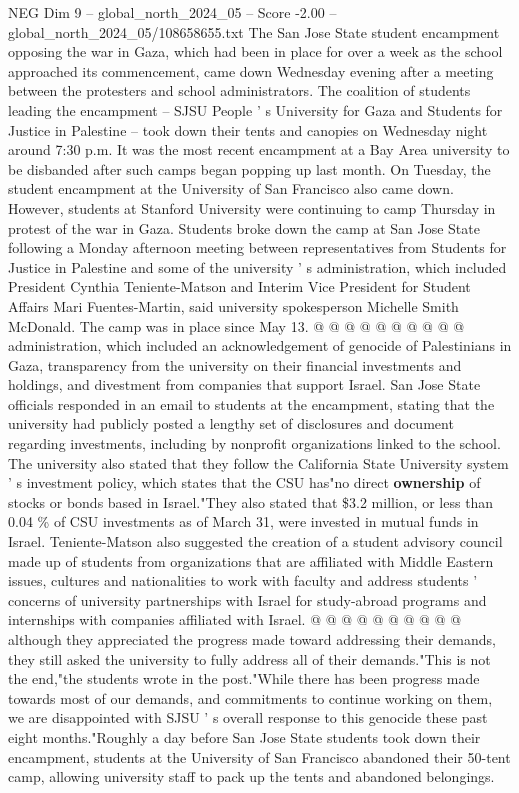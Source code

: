 \begin{textsample}{NEG Dim 9 – global\_north\_2024\_05 – Score -2.00 – global\_north\_2024\_05/108658655.txt}  \label{ex:f9_neg_165}
The San Jose State student encampment opposing the war in Gaza, which had been in place for over a week as the school approached its commencement, came down Wednesday evening after a meeting between the protesters and school administrators.
The coalition of students leading the encampment -- SJSU People ' s University for Gaza and Students for Justice in Palestine -- took down their tents and canopies on Wednesday night around 7:30 p.m.
It was the most recent encampment at a Bay Area university to be disbanded after such camps began popping up last month.
On Tuesday, the student encampment at the University of San Francisco also came down.
However, students at Stanford University were continuing to camp Thursday in protest of the war in Gaza.
Students broke down the camp at San Jose State following a Monday afternoon meeting between representatives from Students for Justice in Palestine and some of the university ' s administration, which included President Cynthia Teniente-Matson and Interim Vice President for Student Affairs Mari Fuentes-Martin, said university spokesperson Michelle Smith McDonald.
The camp was in place since May 13. @ @ @ @ @ @ @ @ @ @ administration, which included an acknowledgement of genocide of Palestinians in Gaza, transparency from the university on their financial investments and holdings, and divestment from companies that support Israel.
San Jose State officials responded in an email to students at the encampment, stating that the university had publicly posted a lengthy set of disclosures and document regarding investments, including by nonprofit organizations linked to the school.
The university also stated that they follow the California State University system ' s investment policy, which states that the CSU has"no direct \textbf{ownership} of stocks or bonds based in Israel."They also stated that \$3.2 million, or less than 0.04 \% of CSU investments as of March 31, were invested in mutual funds in Israel.
Teniente-Matson also suggested the creation of a student advisory council made up of students from organizations that are affiliated with Middle Eastern issues, cultures and nationalities to work with faculty and address students ' concerns of university partnerships with Israel for study-abroad programs and internships with companies affiliated with Israel. @ @ @ @ @ @ @ @ @ @ although they appreciated the progress made toward addressing their demands, they still asked the university to fully address all of their demands."This is not the end,"the students wrote in the post."While there has been progress made towards most of our demands, and commitments to continue working on them, we are disappointed with SJSU ' s overall response to this genocide these past eight months."Roughly a day before San Jose State students took down their encampment, students at the University of San Francisco abandoned their 50-tent camp, allowing university staff to pack up the tents and abandoned belongings.

\end{textsample}
